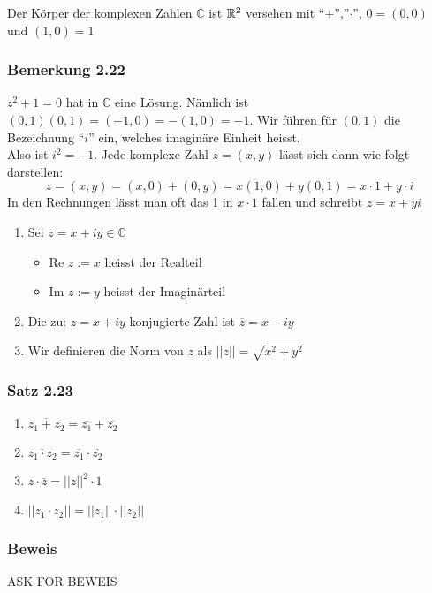\begin{definition}{2.21}
Der Körper der komplexen Zahlen $\mathbb{C}$ ist $\mathbb{R}^2$ versehen mit ``$+$'',''$\cdot$'', $0=(0,0)$ und $(1,0)=1$
\end{definition}

\subsubsection*{Bemerkung 2.22}
$z^2+1=0$ hat in $\mathbb{C}$ eine Lösung. Nämlich ist $(0,1)(0,1)=(-1,0)=-(1,0)=-1$. Wir führen für $(0,1)$ die Bezeichnung ``$i$'' ein, welches imaginäre Einheit heisst.\\

Also ist $i^2=-1$. Jede komplexe Zahl $z=(x,y)$ lässt sich dann wie folgt darstellen:  \[z=(x,y)=(x,0)+(0,y)=x(1,0)+y(0,1)=x\cdot 1+ y\cdot i\]
In den Rechnungen lässt man oft das 1 in $x\cdot 1$ fallen und schreibt $z=x+yi$
\begin{definition}{2.22}
\begin{enumerate}
\item Sei $z=x+iy\in\mathbb{C}$
\begin{itemize}
\item Re $z:=x$ heisst der Realteil
\item Im $z:=y$ heisst der Imaginärteil
\end{itemize}
\item Die zu: $z=x+iy$ konjugierte Zahl ist $\overline{z}=x-iy$
\item Wir definieren die Norm von $z$ als $\left|\left| z\right|\right|=\sqrt{x^2+y^2}$
\end{enumerate}
\end{definition}
\subsubsection*{Satz 2.23}
\begin{enumerate}[\indent (i)]
\item $\overline{z_1+z_2}=\overline{z_1}+\overline{z_2}$
\item $\overline{z_1\cdot z_2}=\overline{z_1}\cdot\overline{z_2}$
\item $z\cdot\overline{z}={\left|\left| z\right|\right|}^2\cdot 1$
\item ${\left|\left| z_1\cdot z_2\right|\right|}={\left|\left| z_1\right|\right|}\cdot{\left|\left| z_2\right|\right|}$
\end{enumerate}
\subsubsection*{Beweis}
ASK FOR BEWEIS 
